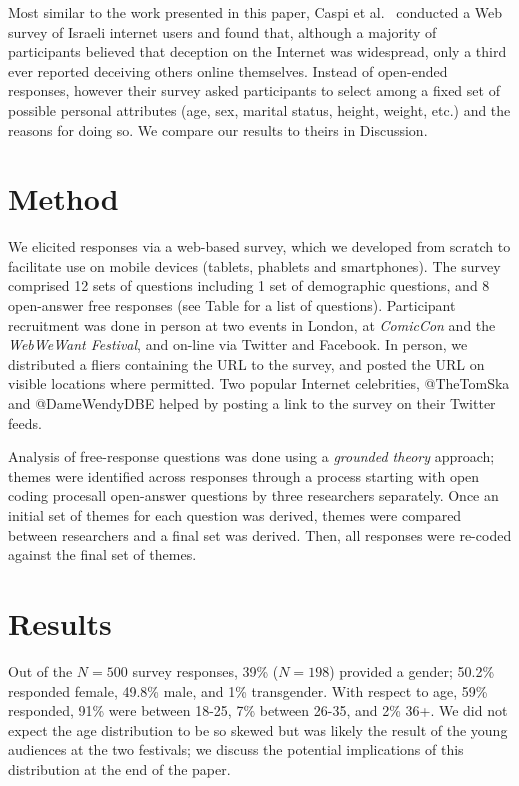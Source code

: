 \documentclass{sig-alternate}
\begin{document}
Most similar to the work presented in this paper, Caspi et al.~\cite{caspi2006online} conducted a Web survey of Israeli internet users and found that, although a majority of participants believed that deception on the Internet was widespread, only a third ever reported deceiving others online themselves.  Instead of open-ended responses, however their survey asked participants to select among a fixed set of possible personal attributes (age, sex, marital status, height, weight, etc.) and the reasons for doing so. We compare our results to theirs in Discussion.

\section{Method}

We elicited responses via a web-based survey, which we developed from scratch to facilitate use on mobile devices (tablets, phablets and smartphones).  The survey comprised 12 sets of questions including 1 set of demographic questions, and 8 open-answer free responses (see Table \cite{} for a list of questions).  Participant recruitment was done in person at two events in London, at \emph{ComicCon} and the \emph{WebWeWant Festival}, and on-line via Twitter and Facebook.  In person, we distributed a fliers containing the URL to the survey, and posted the URL on visible locations where permitted.  Two popular Internet celebrities, @TheTomSka and @DameWendyDBE helped by posting a link to the survey on their Twitter feeds.

Analysis of free-response questions was done using a \emph{grounded theory} approach; themes were identified across responses through a process starting with open coding procesall open-answer questions by three researchers separately.  Once an initial set of themes for each question was derived, themes were compared between researchers and a final set was derived.  Then, all responses were re-coded against the final set of themes.

\section{Results}

Out of the $N=500$ survey responses, 39\% ($N=198$) provided a gender; 50.2\% responded female, 49.8\% male, and 1\% transgender.  With respect to age, 59\% responded, 91\% were between 18-25, 7\% between 26-35, and 2\% 36+.  We did not expect the age distribution to be so skewed but was likely the result of the young audiences at the two festivals; we discuss the potential implications of this distribution at the end of the paper.
\end{document}
